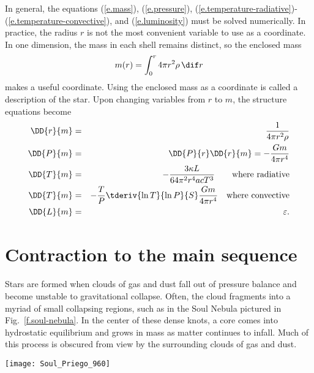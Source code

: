 \begin{sidebar}
\label{sb.lagrangian-equations}
In general, the equations (\ref{e.mass}), (\ref{e.pressure}), (\ref{e.temperature-radiative})-(\ref{e.temperature-convective}), and (\ref{e.luminosity}) must be solved numerically. In practice, the radius $r$ is not the most convenient variable to use as a coordinate. In one dimension, the mass in each shell remains distinct, so the enclosed mass
\[
	m(r) = \int_{0}^{r} 4\pi r^{2}\rho\,\dif r
\]
makes a useful coordinate. Using the enclosed mass as a coordinate is called a  description of the star.  Upon changing variables from $r$ to $m$, the structure equations become
\begin{eqnarray}
\DD{r}{m} &=& \frac{1}{4\pi r^{2}\rho}\label{e.lagrange-r}\\
\DD{P}{m} &=& \DD{P}{r}\DD{r}{m} = -\frac{Gm}{4\pi r^{4}}\label{e.lagrange-P}\\
\DD{T}{m} &=& - \frac{3\kappa L}{64\pi^{2} r^{4} acT^{3}}\qquad \textrm{where radiative}\label{e.lagrange-T-radiative}\\
\DD{T}{m} &=& -\frac{T}{P}\tderiv{\ln T}{\ln P}{S}\frac{Gm}{4\pi r^{4}} \quad \textrm{where convective}\label{e.lagrange-T-convective}\\
\DD{L}{m} &=& \varepsilon.\label{e.lagrange-L}
\end{eqnarray}
\end{sidebar}

\section{Contraction to the main sequence}
\label{s.contraction-to-main-sequence}

Stars are formed when clouds of gas and dust fall out of pressure balance and become unstable to gravitational collapse. Often, the cloud fragments into a myriad of small collapsing regions, such as in the Soul Nebula pictured in Fig.~\ref{f.soul-nebula}. In the center of these dense knots, a core comes into hydrostatic equilibrium and grows in mass as matter continues to infall. Much of this process is obscured from view by the surrounding clouds of gas and dust.
\begin{marginfigure}
\texttt{[image: Soul\_Priego\_960]}
\caption[Soul Nebula]{\label{f.soul-nebula} Image of the Soul Nebula (IC 1848) in the constellation Cassiopeia. Credit: Jos\'e Jim\'enez Priego (Astromet).}
\end{marginfigure}

